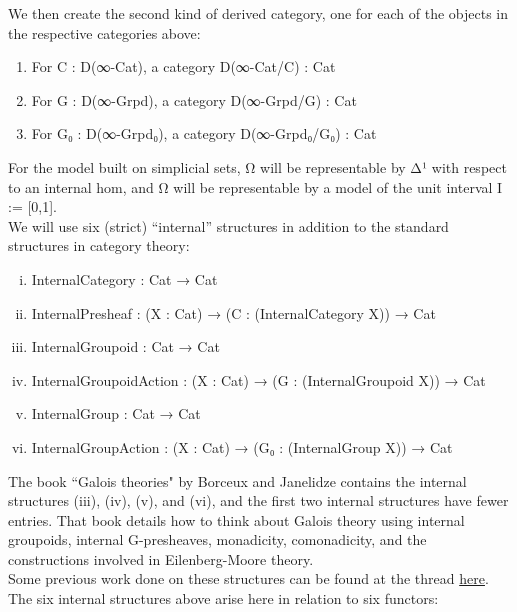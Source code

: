 \documentclass{book}
\theoremstyle{definition}
\begin{document}
We then create the second kind of derived category, one for each of the objects in the respective categories above:

\begin{enumerate}
\item For C : D(∞-Cat), a category D(∞-Cat/C) : Cat
\item For G : D(∞-Grpd), a category D(∞-Grpd/G) : Cat
\item For G₀ : D(∞-Grpd₀), a category D(∞-Grpd₀/G₀) : Cat
\end{enumerate}

For the model built on simplicial sets, Ω⃗ will be representable by Δ¹ with respect to an internal hom, and Ω⃡ will be representable by a model of the unit interval I := [0,1].\\

We will use six (strict) ``internal'' structures in addition to the standard structures in category theory:

\begin{enumerate}[(i)]
\item InternalCategory : Cat → Cat 
\item InternalPresheaf : (X : Cat) → (C : (InternalCategory X)) → Cat
\item InternalGroupoid : Cat → Cat
\item InternalGroupoidAction : (X : Cat) → (G : (InternalGroupoid X)) → Cat
\item InternalGroup : Cat → Cat
\item InternalGroupAction : (X : Cat) → (G₀ : (InternalGroup X)) → Cat   
\end{enumerate}

The book ``Galois theories" by Borceux and Janelidze contains the internal structures (iii), (iv), (v), and (vi), and the first two internal structures have fewer entries. That book details how to think about Galois theory using internal groupoids, internal G-presheaves, monadicity, comonadicity, and the constructions involved in Eilenberg-Moore theory.\\

Some previous work done on these structures can be found at the thread \href{https://leanprover.zulipchat.com/#narrow/stream/116395-maths/topic/Internal.20categories}{here}.\\

The six internal structures above arise here in relation to six functors:
\end{document}
